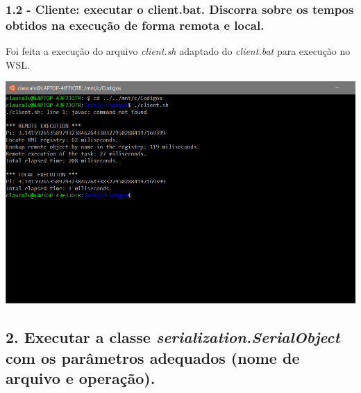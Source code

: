 \subsubsection{1.2 - Cliente: executar o client.bat. Discorra sobre os tempos obtidos na
execução de forma remota e local.}

Foi feita a execução do arquivo \textit{client.sh} adaptado do \textit{client.bat} para execução no WSL.

\vspace{2em}
\begin{minipage}{\textwidth}
    \hspace{-1em}
    \centering
    \includegraphics[trim= 0 150 250 0, clip, scale=.4]{pratica2remover/prints/client.PNG}
    \label{threadspng}
    \hspace{1em}
\end{minipage}
\vspace{0.5em}


\subsection*{2. Executar a classe \textit{serialization.SerialObject} com os parâmetros adequados (nome de arquivo e operação).}



